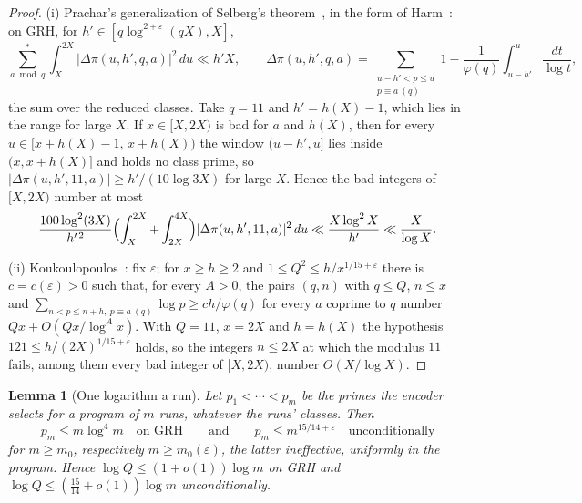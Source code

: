 \documentclass[11pt]{article}
\newtheorem{lemma}[theorem]{Lemma}
\theoremstyle{remark}
\begin{document}
\begin{proof}
(i) Prachar's generalization of Selberg's theorem~\cite{prachar}, in the form
of Harm~\cite[Cor.~2.10]{harm}: on GRH, for $h'\in[q\log^{2+\varepsilon}(qX),X]$,
\[
  \sum_{a\bmod q}^{\ast}\int_X^{2X}\bigl|\Delta\pi(u,h',q,a)\bigr|^2\,du\ll h'X,
  \qquad
  \Delta\pi(u,h',q,a)=\sum_{\substack{u-h'<p\le u\\ p\equiv a\ (q)}}1
  -\frac1{\varphi(q)}\int_{u-h'}^{u}\frac{dt}{\log t},
\]
the sum over the reduced classes.  Take $q=11$ and $h'=h(X)-1$, which lies in
the range for large $X$.  If $x\in[X,2X)$ is bad for $a$ and $h(X)$, then
for every $u\in[x+h(X)-1,\,x+h(X))$ the window $(u-h',u]$ lies inside
$(x,x+h(X)]$ and holds no class prime, so
$|\Delta\pi(u,h',11,a)|\ge h'/(10\log3X)$ for large $X$.  Hence the bad
integers of $[X,2X)$ number at most
\[
  \frac{100\log^2(3X)}{h'^{\,2}}
  \Bigl(\int_X^{2X}+\int_{2X}^{4X}\Bigr)|\Delta\pi(u,h',11,a)|^2\,du
  \ll\frac{X\log^2X}{h'}\ll\frac{X}{\log X}.
\]

(ii) Koukoulopoulos~\cite[Thm.~1.3]{kouk}: fix $\varepsilon$; for $x\ge h\ge2$
and $1\le Q^2\le h/x^{1/15+\varepsilon}$ there is $c=c(\varepsilon)>0$ such
that, for every $A>0$, the pairs $(q,n)$ with $q\le Q$, $n\le x$ and
$\sum_{n<p\le n+h,\ p\equiv a\ (q)}\log p\ge ch/\varphi(q)$ for every $a$
coprime to $q$ number $Qx+O(Qx/\log^Ax)$.  With $Q=11$, $x=2X$ and $h=h(X)$
the hypothesis $121\le h/(2X)^{1/15+\varepsilon}$ holds, so the integers
$n\le2X$ at which the modulus $11$ fails, among them every bad integer of
$[X,2X)$, number $O(X/\log X)$.
\end{proof}

\begin{lemma}[One logarithm a run]\label{lem:walk}
Let $p_1<\cdots<p_m$ be the primes the encoder selects for a program of $m$
runs, whatever the runs' classes.  Then
\[
  p_m\le m\log^4m\quad\text{on GRH}\qquad\text{and}\qquad
  p_m\le m^{15/14+\varepsilon}\quad\text{unconditionally}
\]
for $m\ge m_0$, respectively $m\ge m_0(\varepsilon)$, the latter
ineffective, uniformly in the program.  Hence $\log Q\le(1+o(1))\log m$ on
GRH and $\log Q\le(\tfrac{15}{14}+o(1))\log m$ unconditionally.
\end{lemma}
\end{document}
